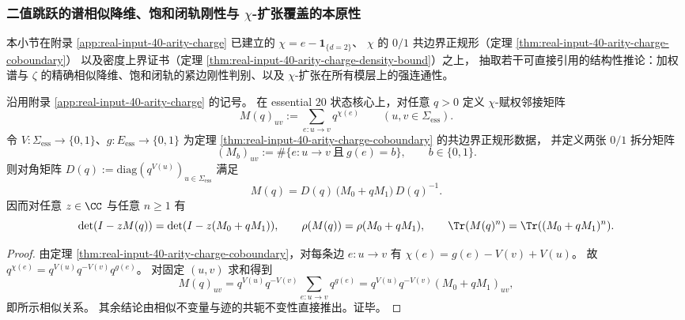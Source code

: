\subsubsection{二值跳跃的谱相似降维、饱和闭轨刚性与 \texorpdfstring{$\chi$}{chi}-扩张覆盖的本原性}\label{app:real-input-40-arity-charge-structural-rigidity}
本小节在附录 \ref{app:real-input-40-arity-charge} 已建立的
\(\chi=e-\mathbf{1}_{\{d=2\}}\)、
\(\chi\) 的 \(0/1\) 共边界正规形（定理 \ref{thm:real-input-40-arity-charge-coboundary}）
以及密度上界证书（定理 \ref{thm:real-input-40-arity-charge-density-bound}）之上，
抽取若干可直接引用的结构性推论：加权谱与 \(\zeta\) 的精确相似降维、饱和闭轨的紧边刚性判别、以及 \(\chi\)-扩张在所有模层上的强连通性。

\begin{proposition}[加权邻接矩阵的精确相似降维]\label{prop:real-input-40-arity-charge-similarity-reduction}
沿用附录 \ref{app:real-input-40-arity-charge} 的记号。
在 essential $20$ 状态核心上，对任意 \(q>0\) 定义 \(\chi\)-赋权邻接矩阵
\[
M(q)_{uv}:=\sum_{e:u\to v} q^{\chi(e)}\qquad(u,v\in\Sigma_{\mathrm{ess}}).
\]
令 \(V:\Sigma_{\mathrm{ess}}\to\{0,1\}\)、\(g:E_{\mathrm{ess}}\to\{0,1\}\) 为定理 \ref{thm:real-input-40-arity-charge-coboundary} 的共边界正规形数据，
并定义两张 \(0/1\) 拆分矩阵
\[
(M_b)_{uv}:=\#\{e:u\to v\ \text{且}\ g(e)=b\},
\qquad b\in\{0,1\}.
\]
则对角矩阵 \(D(q):=\mathrm{diag}(q^{V(u)})_{u\in\Sigma_{\mathrm{ess}}}\) 满足
\[
\boxed{\;M(q)=D(q)\,\bigl(M_0+qM_1\bigr)\,D(q)^{-1}.\;}
\]
因而对任意 \(z\in\CC\) 与任意 \(n\ge 1\) 有
\[
\det(I-zM(q))=\det(I-z(M_0+qM_1)),
\qquad
\rho(M(q))=\rho(M_0+qM_1),
\qquad
\Tr(M(q)^n)=\Tr((M_0+qM_1)^n).
\]
\end{proposition}
\begin{proof}
由定理 \ref{thm:real-input-40-arity-charge-coboundary}，对每条边 \(e:u\to v\) 有
\(
\chi(e)=g(e)-V(v)+V(u)
\)。
故 \(q^{\chi(e)}=q^{V(u)}q^{-V(v)}q^{g(e)}\)。
对固定 \((u,v)\) 求和得到
\[
M(q)_{uv}
=q^{V(u)}q^{-V(v)}\sum_{e:u\to v}q^{g(e)}
=q^{V(u)}q^{-V(v)}(M_0+qM_1)_{uv},
\]
即所示相似关系。
其余结论由相似不变量与迹的共轭不变性直接推出。证毕。
\end{proof}

